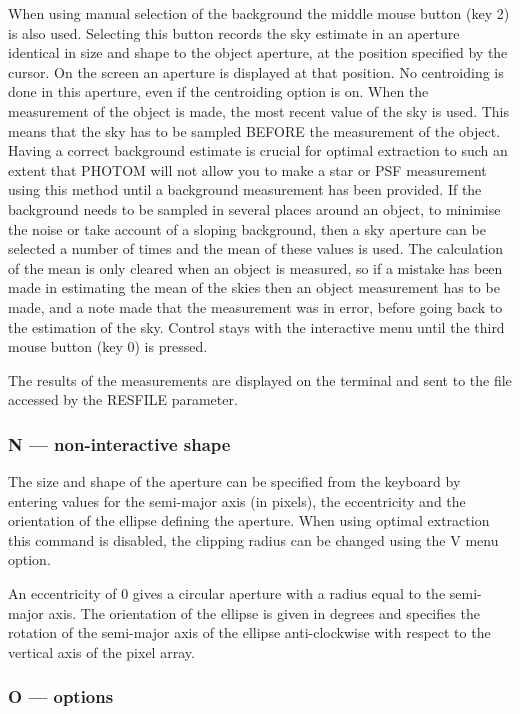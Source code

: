 \documentclass[twoside,11pt]{article}
\renewcommand{\_}{\texttt{\symbol{95}}}
\begin{document}
When using manual selection of the background the middle mouse button
(key 2) is also used. Selecting this button records the sky estimate
in an aperture identical in size and shape to the object aperture, at
the position specified by the cursor. On the screen an aperture is
displayed at that position. No centroiding is done in this aperture,
even if the centroiding option is on. When the measurement of the
object is made, the most recent value of the sky is used. This means
that the sky has to be sampled BEFORE the measurement of the
object. Having a correct background estimate is crucial for optimal
extraction to such an extent that PHOTOM will not allow you to make a
star or PSF measurement using this method until a background measurement
has been provided. If the background needs to be sampled in several places around an object, to minimise the noise or take account of a sloping
background, then a sky aperture can be selected a number of times
and the mean of these values is used. The calculation of the
mean is only cleared when an object is measured, so if a mistake
has been made in estimating the mean of the skies then an object
measurement has to be made, and a note made that the measurement
was in error, before going back to the estimation of the sky. Control
stays with the interactive menu until the third mouse button (key 0)
is pressed.

The results of the measurements are displayed on the terminal and sent
to the file accessed by the RESFILE parameter.

\subsubsection{N --- non-interactive shape}

The size and shape of the aperture can be specified from the keyboard
by entering values for the semi-major axis (in pixels), the
eccentricity and the orientation of the ellipse defining the aperture.
When using optimal extraction this command is disabled, the clipping radius 
can be changed using the V menu option.

An eccentricity of 0 gives a circular aperture with a radius equal
to the semi-major axis. The orientation of the ellipse is given in
degrees and specifies the rotation of the semi-major axis of the
ellipse anti-clockwise with respect to the vertical axis of the pixel
array.

\subsubsection{O --- options}
\end{document}

